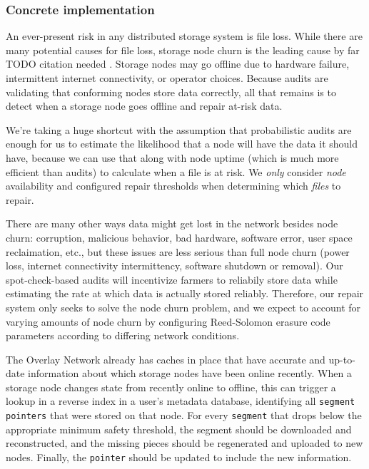\documentclass[a4paper,10pt]{article} \usepackage[utf8]{inputenc}
\newcommand{\x}[1]{{\tt #1}} \newcommand{\code}[1]{{\tt #1}}
\newcommand{\todo}[1]{{\color{red} TODO #1 }}
\begin{document}
\subsubsection{Concrete implementation}

An ever-present risk in any distributed storage system is file loss. While there
are many potential causes for file loss, storage node churn is the leading
cause by far \todo{citation needed}. Storage nodes may go offline due to
hardware failure, intermittent internet connectivity, or operator choices.
Because audits are validating that conforming nodes store data correctly, all
that remains is to detect when a storage node goes offline and repair at-risk
data.

We're taking a huge shortcut with the assumption that
probabilistic audits are enough for us to estimate the likelihood that a node
will have the data it should have, because we can use that 
along with node uptime (which is much more efficient than audits) 
to calculate when a file is at risk.
We {\em only} consider {\em node} availability and configured repair thresholds
when determining which {\em files} to repair.

There are many other ways data might get lost in the network besides node churn:
corruption, malicious behavior, bad hardware, software error, user space
reclaimation, etc., but these issues are less serious than full node 
churn (power loss, internet connectivity intermittency, 
software shutdown or removal).
Our spot-check-based audits will incentivize farmers to reliabily store data
while estimating the rate at which data is actually stored reliably.
Therefore, our repair system only seeks to solve the node churn problem, and
we expect to account for varying
amounts of node churn by configuring Reed-Solomon erasure code
parameters according to differing network conditions.

The Overlay Network already has caches in place that have accurate and
up-to-date information about which storage nodes have been online recently.
When a storage node changes state from recently online to offline, this can
trigger a lookup in a reverse index in a user's metadata database, identifying
all \x{segment} \x{pointers} that were stored on that node.
For every \x{segment} that drops below the appropriate minimum safety
threshold, the segment should be downloaded and reconstructed, and the missing
pieces should be regenerated and uploaded to new nodes. Finally, the
\x{pointer} should be updated to include the new information.
\end{document}
